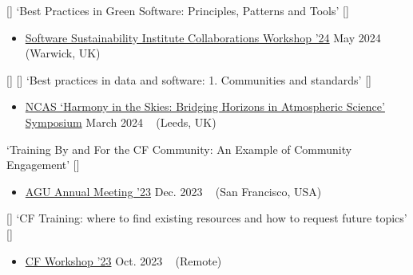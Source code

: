 \begin{talks}
    \talk
	{\faCommentingO \hspace{1mm} [\faUserPlus] \hspace{1mm} `Best Practices in Green Software: Principles, Patterns and Tools' [\href{https://www.youtube.com/watch?v=dWoRartHwgA}{\small{\videoSymbol}}]}
	{
	\begin{itemize}[leftmargin=.4in]
	    \item \href{https://www.software.ac.uk/workshop/collaborations-workshop-2024-cw24}{Software Sustainability Institute Collaborations Workshop '24}
	    \hfill May 2024 ~ (Warwick, UK)
	\end{itemize}
	}

    \talk
	{\faCommentingO \hspace{1mm} [\faUserPlus] \hspace{1mm} [\faEnvelopeO] \hspace{1mm} `Best practices in data and software: 1. Communities and standards' [\href{https://github.com/sadielbartholomew/sadielbartholomew/blob/master/talks-and-workshops/ncas-ec-symposium-software-data.pdf}{\small{\linkSymbol}}]}
	{
	\begin{itemize}[leftmargin=.4in]
	    \item \href{https://sites.google.com/ncas.ac.uk/ncasharmonyintheskies/home}{NCAS `Harmony in the Skies: Bridging Horizons in Atmospheric Science' Symposium}
	    \hfill March 2024 ~ (Leeds, UK)
	\end{itemize}
	}

    \talk
	{\faCommentingO \hspace{1mm} `Training By and For the CF Community: An Example of Community Engagement' [\href{https://figshare.com/articles/presentation/Training_By_and_For_the_CF_Community_An_Example_of_Community_Engagement/24814140?file=43646967}{\small{\linkSymbol}}]}
	{
	\begin{itemize}[leftmargin=.4in]
	    \item \href{https://agu.confex.com/agu/fm23/meetingapp.cgi/Home/0}{AGU Annual Meeting '23}
	    \hfill Dec. 2023 ~ (San Francisco, USA)
	\end{itemize}
	}

    \talk
	{\faCommentingO \hspace{1mm} [\faEnvelopeO] \hspace{1mm} `CF Training: where to find existing resources and how to request future topics' [\href{https://github.com/sadielbartholomew/sadielbartholomew/blob/master/talks-and-workshops/CF_training_lightning_talk_SLB.pdf}{\small{\linkSymbol}}]}
	{
	\begin{itemize}[leftmargin=.4in]
	    \item \href{https://cfconventions.org/Meetings/2023-Workshop.html}{CF Workshop '23}
	    \hfill Oct. 2023 ~ (Remote)
	\end{itemize}
	}


\end{talks}
